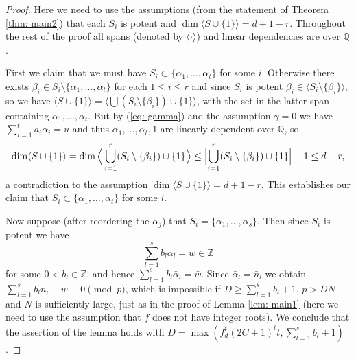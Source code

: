 \documentclass[alphabetic]{amsart}
\newtheorem{lem}[claim]{Lemma}
\theoremstyle{definition}
\numberwithin{equation}{section}
\newcommand{\case}[1]{\vspace{0.3cm}\noindent\framebox{#1.}}
\newcommand{\Z}{{\mathbb Z}}
\newcommand{\Q}{{\mathbb Q}}
\newcommand{\Qb}{{\overline{\Q}}}
\newcommand{\Gal}{{\mathrm{Gal}}}
\renewcommand{\Cup}{\bigcup}
\numberwithin{equation}{section}
\begin{document}
\begin{proof}
\case{$\gamma=0$} Here we need to use the assumptions (from the statement of Theorem \ref{thm: main2}) that each $S_i$ is potent and 
$\dim\langle S\cup\{1\}\rangle=d+1-r$. Throughout the rest of the proof all spans (denoted by $\langle\cdot\rangle$) and linear dependencies are over $\Q$. 

First we claim that we must have $S_i\subset\{\alpha_1,\ldots,\alpha_t\}$ for some $i$. Otherwise there exists $\beta_i\in S_i\setminus\{\alpha_1,\ldots,\alpha_t\}$ for each $1\le i\le r$ and since $S_i$ is potent $\beta_i\in\langle S_i\setminus\{\beta_i\}\rangle$, so we have
$\langle S\cup\{1\}\rangle=\langle \Cup(S_i\setminus\{\beta_i\})\cup\{1\}\rangle$, with the set in the latter span containing $\alpha_1,\ldots,\alpha_t$. But by (\ref{eq: gamma}) and the assumption $\gamma=0$ we have $\sum_{i=1}^ta_i\alpha_i=u$ and thus $\alpha_1,\ldots,\alpha_t,1$ are linearly dependent over $\Q$, so $$\dim\langle S\cup\{1\}\rangle=\dim\Big\langle \Cup_{i=1}^r(S_i\setminus\{\beta_i\})\cup\{1\}\Big\rangle\le\Bigl|\Cup_{i=1}^r(S_i\setminus\{\beta_i\})\cup\{1\}\Bigr|-1\le d-r,$$ a contradiction to the assumption $\dim\langle S\cup\{1\}\rangle=d+1-r$. This establishes our claim that $S_i\subset\{\alpha_1,\ldots,\alpha_t\}$ for some $i$.

Now suppose (after reordering the $\alpha_j$) that $S_i=\{\alpha_{1},\ldots,\alpha_{{s}}\}$. 
Then since $S_i$ is potent we have $$\sum_{l=1}^{s}b_l\alpha_{l}=w\in\Z$$ for some $0< b_l\in\Z$, and hence $\sum_{l=1}^{s}b_l\bar\alpha_{l}=\bar w$. Since $\bar\alpha_{l}=\bar n_{l}$ we obtain $\sum_{l=1}^{s}b_{l}n_{i}-w\equiv 0\pmod {p}$, which is impossible if $D\ge\sum_{l=1}^{s}b_{l}+1$, $p>DN$ and $N$ is sufficiently large, just as in the proof of Lemma \ref{lem: main1} (here we need to use the assumption that $f$ does not have integer roots). We conclude that the assertion of the lemma holds with $D=\max\left(f_d^t(2C+1)^tt,\sum_{l=1}^sb_l+1\right)$. 


\end{proof}



\end{document}
